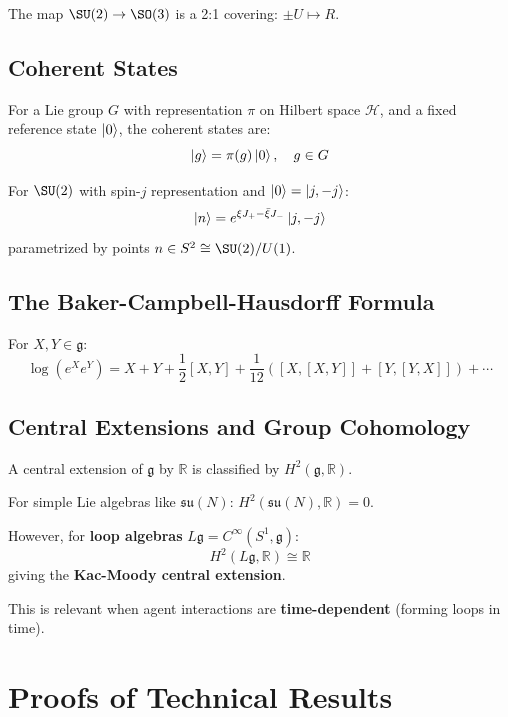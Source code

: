 \documentclass[11pt,a4paper]{article}
\newcommand{\R}{\mathbb{R}}
\begin{document}
The map $\SU(2) \to \SO(3)$ is a 2:1 covering: $\pm U \mapsto R$.

\subsection{Coherent States}

For a Lie group $G$ with representation $\pi$ on Hilbert space $\mathcal{H}$, and a fixed reference state $\ket{0}$, the coherent states are:
\begin{equation}
    \ket{g} = \pi(g)\ket{0}, \quad g \in G
\end{equation}

For $\SU(2)$ with spin-$j$ representation and $\ket{0} = \ket{j, -j}$:
\begin{equation}
    \ket{n} = e^{\xi J_+ - \bar{\xi} J_-}\ket{j, -j}
\end{equation}
parametrized by points $n \in S^2 \cong \SU(2)/U(1)$.

\subsection{The Baker-Campbell-Hausdorff Formula}

For $X, Y \in \mathfrak{g}$:
\begin{equation}
    \log(e^X e^Y) = X + Y + \frac{1}{2}[X, Y] + \frac{1}{12}([X, [X, Y]] + [Y, [Y, X]]) + \cdots
\end{equation}

\subsection{Central Extensions and Group Cohomology}

A central extension of $\mathfrak{g}$ by $\R$ is classified by $H^2(\mathfrak{g}, \R)$.

For simple Lie algebras like $\mathfrak{su}(N)$: $H^2(\mathfrak{su}(N), \R) = 0$.

However, for \textbf{loop algebras} $L\mathfrak{g} = C^\infty(S^1, \mathfrak{g})$:
\begin{equation}
    H^2(L\mathfrak{g}, \R) \cong \R
\end{equation}
giving the \textbf{Kac-Moody central extension}.

This is relevant when agent interactions are \textbf{time-dependent} (forming loops in time).

\section{Proofs of Technical Results}
\end{document}
